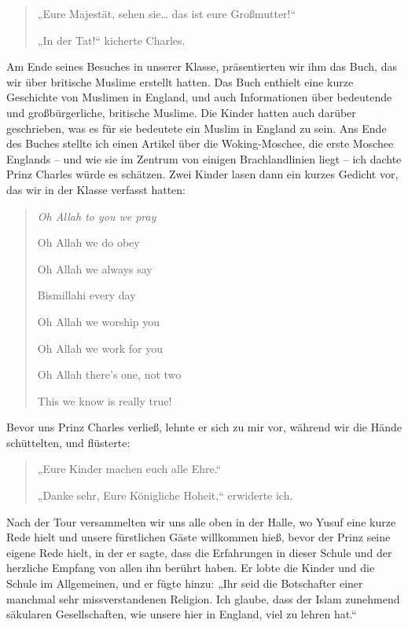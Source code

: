\documentclass[12pt]{memoir}
\def\–{\hskip0pt-\hskip0pt}
\begin{document}
\begin{quote}
„Eure Majestät, sehen sie… das ist eure Großmutter!“

„In der Tat!“ kicherte Charles.
\end{quote}

Am Ende seines Besuches in unserer Klasse,
präsentierten wir ihm das Buch,
das wir über britische Muslime erstellt hatten.
Das Buch enthielt eine kurze Geschichte von Muslimen in England,
und auch Informationen über bedeutende und großbürgerliche, britische Muslime.
Die Kinder hatten auch darüber geschrieben,
was es für sie bedeutete ein Muslim in England zu sein.
Ans Ende des Buches stellte ich einen Artikel über die Woking\–Moschee,
die erste Moschee Englands –
und wie sie im Zentrum von einigen Brachlandlinien liegt –
ich dachte Prinz Charles würde es schätzen.
Zwei Kinder lasen dann ein kurzes Gedicht vor,
das wir in der Klasse verfasst hatten:

\begin{quote}
\itshape
Oh Allah to you we pray

Oh Allah we do obey

Oh Allah we always say

Bismillahi every day

Oh Allah we worship you

Oh Allah we work for you

Oh Allah there’s one, not two

This we know is really true!
\end{quote}

Bevor uns Prinz Charles verließ, lehnte er sich zu mir vor,
während wir die Hände schüttelten, und flüsterte:

\begin{quote}
„Eure Kinder machen euch alle Ehre.“

„Danke sehr, Eure Königliche Hoheit,“ erwiderte ich.
\end{quote}

Nach der Tour versammelten wir uns alle oben in der Halle,
wo Yusuf eine kurze Rede hielt und unsere fürstlichen Gäste willkommen hieß,
bevor der Prinz seine eigene Rede hielt,
in der er sagte, dass die Erfahrungen in dieser Schule
und der herzliche Empfang von allen ihn berührt haben.
Er lobte die Kinder und die Schule im Allgemeinen, und er fügte hinzu:
„Ihr seid die Botschafter einer manchmal sehr missverstandenen Religion.
Ich glaube, dass der Islam zunehmend säkularen Gesellschaften,
wie unsere hier in England, viel zu lehren hat.“
\end{document}
